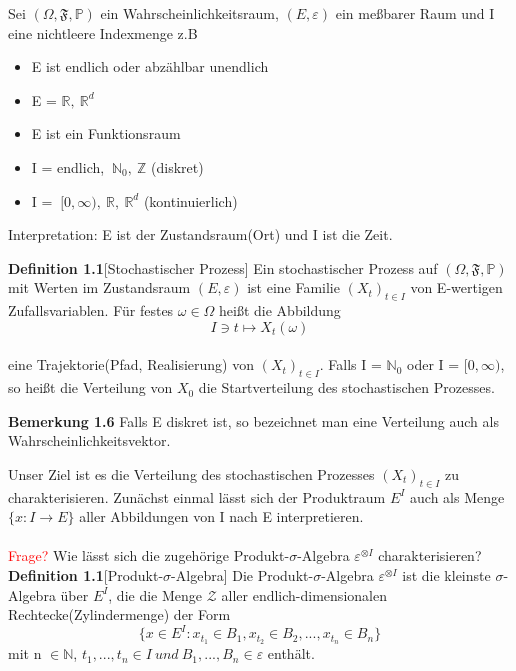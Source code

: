Sei $(\Omega, \mathfrak{F}, \mathbb{P})$ ein Wahrscheinlichkeitsraum, $(E, \varepsilon)$ ein meßbarer Raum und I eine nichtleere Indexmenge z.B 
\begin{itemize}
    \item E ist endlich oder abzählbar unendlich
    \item E = $\mathbb{R},\: \mathbb{R}^{d}$
    \item E ist ein Funktionsraum
    \item I = endlich, $\: \mathbb{N}_{0},\: \mathbb{Z}$ (diskret)
    \item I = $\: [0,\infty), \:\mathbb{R}, \:\mathbb{R}^{d}$ (kontinuierlich)
\end{itemize}
Interpretation: E ist der Zustandsraum(\glqq Ort\grqq{}) und I ist die \glqq Zeit\grqq{}.

\textbf{Definition 1.1}[Stochastischer Prozess]
Ein stochastischer Prozess auf $(\Omega, \mathfrak{F}, \mathbb{P})$ mit Werten im Zustandsraum $(E, \varepsilon)$ ist eine Familie $(X_{t})_{t\in I}$ von E-wertigen Zufallsvariablen. Für festes $\omega \in \Omega$ heißt die Abbildung
\\
\begin{equation*}
I \ni t \mapsto X_{t}(\omega)
\end{equation*}
\\
eine Trajektorie(Pfad, Realisierung) von $(X_{t})_{t\in I}$. Falls I = $\mathbb{N}_{0}$ oder I = $[0,\infty)$, so heißt die Verteilung von $X_{0}$ die Startverteilung des stochastischen Prozesses.

\textbf{Bemerkung 1.6}
Falls E diskret ist, so bezeichnet man eine Verteilung auch als Wahrscheinlichkeitsvektor.
 
\noindent 
Unser Ziel ist es die Verteilung des stochastischen Prozesses $(X_{t})_{t\in I}$ zu charakterisieren. Zunächst einmal lässt sich der Produktraum $E^{I}$ auch als Menge $\lbrace x: I \to E\rbrace$ aller Abbildungen von I nach E interpretieren. 
\\
\\
\textcolor{red}{Frage?} Wie lässt sich die zugehörige Produkt-$\sigma$-Algebra $\varepsilon^{ \otimes I}$ charakterisieren?
\textbf{Definition 1.1}[Produkt-$\sigma$-Algebra]
Die Produkt-$\sigma$-Algebra $\varepsilon^{ \otimes I}$ ist die kleinste $\sigma$-Algebra über $E^{I}$, die die Menge $\mathcal{Z}$ aller endlich-dimensionalen Rechtecke(Zylindermenge) der Form
\begin{equation*}
\lbrace x \in E^{I} : x_{t_{1}} \in B_{1}, x_{t_{2}} \in B_{2},..., x_{t_{n}} \in B_{n}   \rbrace 
\end{equation*}
mit n $\in \mathbb{N}$, $t_{1},..., t_{n} \in I \: und \:B_{1},...,B_{n} \in \varepsilon $ enthält.


